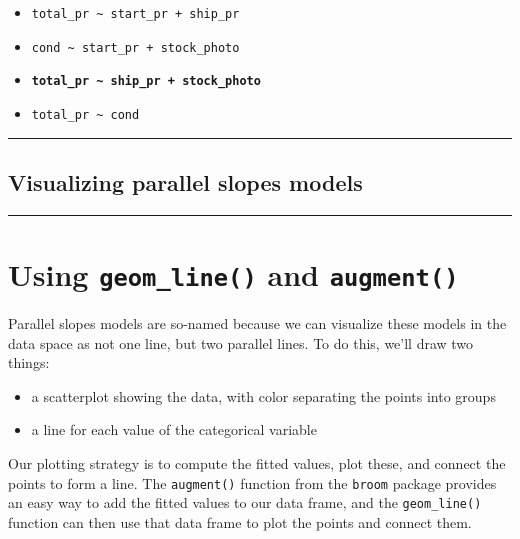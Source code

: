 \documentclass[
]{book}
\begin{document}
\begin{itemize}
\item
  \texttt{total\_pr\ \textasciitilde{}\ start\_pr\ +\ ship\_pr}
\item
  \texttt{cond\ \textasciitilde{}\ start\_pr\ +\ stock\_photo}
\item
  \textbf{\texttt{total\_pr\ \textasciitilde{}\ ship\_pr\ +\ stock\_photo}}
\item
  \texttt{total\_pr\ \textasciitilde{}\ cond}
\end{itemize}

\begin{center}\rule{0.5\linewidth}{0.5pt}\end{center}

\hypertarget{visualizing-parallel-slopes-models}{%
\subsection*{Visualizing parallel slopes models}\label{visualizing-parallel-slopes-models}}

\begin{center}\rule{0.5\linewidth}{0.5pt}\end{center}

\hypertarget{using-geom_line-and-augment}{%
\section{\texorpdfstring{Using \texttt{geom\_line()} and \texttt{augment()}}{Using geom\_line() and augment()}}\label{using-geom_line-and-augment}}

Parallel slopes models are so-named because we can visualize these models in the data space as not one line, but two parallel lines. To do this, we'll draw two things:

\begin{itemize}
\item
  a scatterplot showing the data, with color separating the points into groups
\item
  a line for each value of the categorical variable
\end{itemize}

Our plotting strategy is to compute the fitted values, plot these, and connect the points to form a line. The \texttt{augment()} function from the \texttt{broom} package provides an easy way to add the fitted values to our data frame, and the \texttt{geom\_line()} function can then use that data frame to plot the points and connect them.
\end{document}

